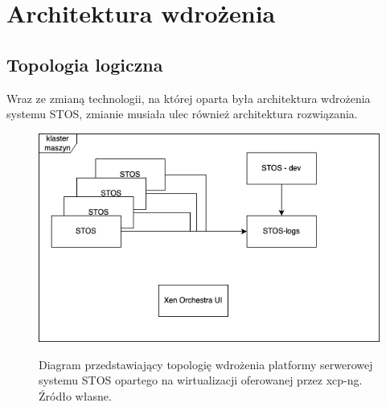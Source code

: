 \section{Architektura wdrożenia}
\subsection{Topologia logiczna}
Wraz ze zmianą technologii, na której oparta była architektura wdrożenia systemu STOS, zmianie musiała ulec również architektura rozwiązania.

\begin{figure}[!h]
	\begin{center}
		\resizebox{0.7\textwidth}{!} {
			\includegraphics{img/4/wdrozenie.png}
		}
		\caption[Topologia wdrożenia systemu STOS]{Diagram przedstawiający topologię wdrożenia platformy serwerowej systemu STOS opartego na wirtualizacji oferowanej przez xcp-ng. Źródło własne.}
		\label{diagramTopologiaStos}
	\end{center}
\end{figure}

